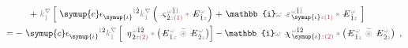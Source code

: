 \begin{subequations}
\begin{align}
	+~ \mathcolor{gray}{k^\nabla_{\check{1}}} \left[~ {\symup{c}} \epsilon^{\hphantom{\symup{\iota}}\mathcolor{gray}{\dot{1}}\dot{2}}_{\symup{\iota}} \mathcolor{gray}{k^\nabla_{\dot{1}}} \left( \Xint{\begin{smallmatrix} ~ \\ {}^{}_{\mathcolor{gray}{-}} \\ ~ \end{smallmatrix}}{13}{\varsigma}^{\;\! \mathcolor{gray}{\omega} \hat{1} \mathcolor{gray}{\check{1}}}_{\;\! \dot{2} \mathcolor{gray}{z} \textcolor{Maroon}{(1)}} \mathcolor{gray}{*} \Xint{\mathcolor{gray}{-}}{295}{E}^{\;\!\mathcolor{gray}{\omega}}_{\;\! \hat{1} \mathcolor{gray}{z}} \right) \right.&+ \left.\mathbb{i} \mathcolor{gray}{\omega} \Xint{\begin{smallmatrix} ~ \\ {}^{}_{\mathcolor{gray}{-}} \\ ~ \end{smallmatrix}}{16}{\varepsilon}^{\;\! \mathcolor{gray}{\omega} \hat{1} \mathcolor{gray}{\check{1}}}_{\;\! \symup{\iota} \mathcolor{gray}{z} \textcolor{Maroon}{(1)}} \mathcolor{gray}{*} \Xint{\mathcolor{gray}{-}}{295}{E}^{\;\!\mathcolor{gray}{\omega}}_{\;\! \hat{1} \mathcolor{gray}{z}} ~\right] \\ 
	= -~ {\symup{c}} \epsilon^{\hphantom{\symup{\iota}}\mathcolor{gray}{\dot{1}}\dot{2}}_{\symup{\iota}} \mathcolor{gray}{k^\nabla_{\dot{1}}} \left[ \Xint{\begin{smallmatrix} ~ \\ {}^{}_{\mathcolor{gray}{-}} \\ ~ \end{smallmatrix}}{17}{\eta}^{\;\! \mathcolor{gray}{\omega} \hat{1} \hat{2}}_{\;\! \dot{2} \mathcolor{gray}{z} \textcolor{Maroon}{(2)}} \mathcolor{gray}{*} \left( \Xint{\mathcolor{gray}{-}}{295}{E}^{\;\!\mathcolor{gray}{\omega}}_{\;\! \hat{1} \mathcolor{gray}{z}} ~\mathcolor{gray}{\widetilde \circledast}~ \Xint{\mathcolor{gray}{-}}{295}{E}^{\;\!\mathcolor{gray}{\omega}}_{\;\! \hat{2} \mathcolor{gray}{z}} \right) \right] &- \mathbb{i} \mathcolor{gray}{\omega} ~\Xint{{}^{}_{\mathcolor{gray}{-}}}{23}{\chi}^{\;\! \mathcolor{gray}{\omega} \hat{1} \hat{2}}_{\;\! \symup{\iota} \mathcolor{gray}{z} \textcolor{Maroon}{(2)}} \mathcolor{gray}{*} \left( \Xint{\mathcolor{gray}{-}}{295}{E}^{\;\!\mathcolor{gray}{\omega}}_{\;\! \hat{1} \mathcolor{gray}{z}} ~\mathcolor{gray}{\widetilde \circledast}~ \Xint{\mathcolor{gray}{-}}{295}{E}^{\;\!\mathcolor{gray}{\omega}}_{\;\! \hat{2} \mathcolor{gray}{z}} \right)~,
\end{align}
\end{subequations}
